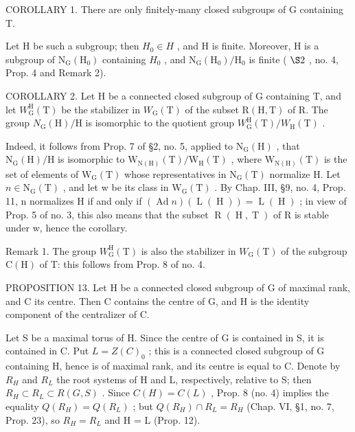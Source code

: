 COROLLARY 1. There are only finitely-many closed subgroups of G containing T.

Let H be such a subgroup; then \(H_{0} \in H\) , and H is finite. Moreover, H is a subgroup of \(\mathrm{N}_{\mathrm{G}}(\mathrm{H}_{0})\) containing \(H_{0}\) , and \(\mathrm{N}_{\mathrm{G}}(\mathrm{H}_{0})/\mathrm{H}_{0}\) is finite ( \(\S2\) , no. 4, Prop. 4 and Remark 2).

COROLLARY 2. Let H be a connected closed subgroup of G containing T, and let \(W_{\mathrm{G}}^{\mathrm{H}}(\mathrm{T})\) be the stabilizer in \(W_{\mathrm{G}}(\mathrm{T})\) of the subset \(\mathrm{R}(\mathrm{H},\mathrm{T})\) of R. The group \(N_{\mathrm{G}}(\mathrm{H})/\mathrm{H}\) is isomorphic to the quotient group \(W_{\mathrm{G}}^{\mathrm{H}}(\mathrm{T})/W_{\mathrm{H}}(\mathrm{T})\) .

Indeed, it follows from Prop. 7 of §2, no. 5, applied to \(\mathrm{N}_{\mathrm{G}}(\mathrm{H})\) , that \(\mathrm{N}_{\mathrm{G}}(\mathrm{H})/\mathrm{H}\) is isomorphic to \(\mathrm{W}_{\mathrm{N}(\mathrm{H})}(\mathrm{T})/\mathrm{W}_{\mathrm{H}}(\mathrm{T})\) , where \(\mathrm{W}_{\mathrm{N}(\mathrm{H})}(\mathrm{T})\) is the set of elements of \(\mathrm{W}_{\mathrm{G}}(\mathrm{T})\) whose representatives in \(\mathrm{N}_{\mathrm{G}}(\mathrm{T})\) normalize H. Let \(n \in \mathrm{N}_{\mathrm{G}}(\mathrm{T})\) , and let w be its class in \(\mathrm{W}_{\mathrm{G}}(\mathrm{T})\) . By Chap. III, §9, no. 4, Prop. 11, n normalizes H if and only if \((\operatorname{Ad} n)(\operatorname{L}(\operatorname{H})) = \operatorname{L}(\operatorname{H})\) ; in view of Prop. 5 of no. 3, this also means that the subset \(\operatorname{R}(\operatorname{H}, \operatorname{T})\) of R is stable under w, hence the corollary.

Remark 1. The group \(W_{\mathrm{G}}^{\mathrm{H}}(\mathrm{T})\) is also the stabilizer in \(W_{\mathrm{G}}(\mathrm{T})\) of the subgroup \(\mathrm{C}(\mathrm{H})\) of T: this follows from Prop. 8 of no. 4.

PROPOSITION 13. Let H be a connected closed subgroup of G of maximal rank, and C its centre. Then C contains the centre of G, and H is the identity component of the centralizer of C.

Let S be a maximal torus of H. Since the centre of G is contained in S, it is contained in C. Put \(L = Z(C)_{0}\) ; this is a connected closed subgroup of G containing H, hence is of maximal rank, and its centre is equal to C. Denote by \(R_{H}\) and \(R_{L}\) the root systems of H and L, respectively, relative to S; then \(R_{H} \subset R_{L} \subset R(G, S)\) . Since \(C(H) = C(L)\) , Prop. 8 (no. 4) implies the equality \(Q(R_{H}) = Q(R_{L})\) ; but \(Q(R_{H}) \cap R_{L} = R_{H}\) (Chap. VI, §1, no. 7, Prop. 23), so \(R_{H} = R_{L}\) and H = L (Prop. 12).

